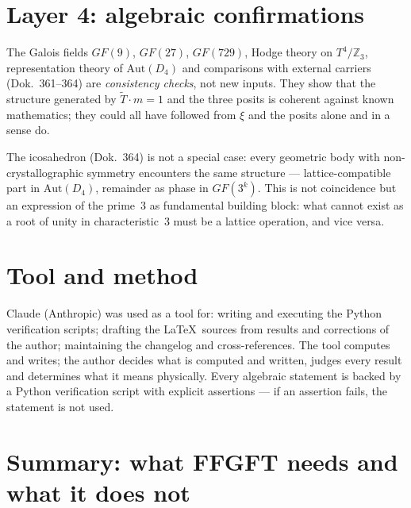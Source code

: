 \section{Layer 4: algebraic confirmations}

The Galois fields $GF(9)$, $GF(27)$, $GF(729)$, Hodge theory on
$T^4/\mathbb{Z}_3$, representation theory of $\mathrm{Aut}(D_4)$ and
comparisons with external carriers (Dok.~361--364) are \emph{consistency
checks}, not new inputs. They show that the structure generated by
$\tilde{T}\cdot m=1$ and the three posits is coherent against known
mathematics; they could all have followed from $\xi$ and the posits alone
and in a sense do.

The icosahedron (Dok.~364) is not a special case: every geometric body with
non-crystallographic symmetry encounters the same structure --- lattice-compatible
part in $\mathrm{Aut}(D_4)$, remainder as phase in $GF(3^k)$. This is not
coincidence but an expression of the prime~3 as fundamental building block:
what cannot exist as a root of unity in characteristic~3 must be a lattice
operation, and vice versa.

\section*{Tool and method}

Claude (Anthropic) was used as a tool for: writing and executing the Python
verification scripts; drafting the \LaTeX\ sources from results and corrections
of the author; maintaining the changelog and cross-references. The tool computes
and writes; the author decides what is computed and written, judges every result
and determines what it means physically. Every algebraic statement is backed by
a Python verification script with explicit assertions --- if an assertion fails,
the statement is not used.

\section{Summary: what FFGFT needs and what it does not}


